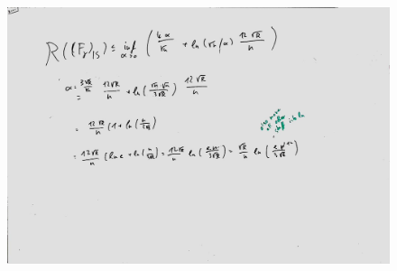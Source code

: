 \begin{figure}[htb]
	\centering
	\includegraphics[width=\textwidth]{whiteboard_notes/21.jpg}
\end{figure}